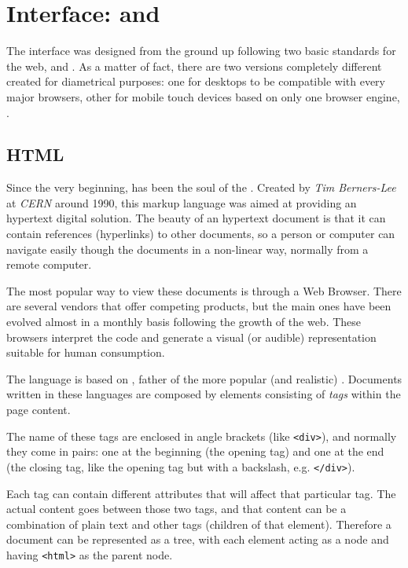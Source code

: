 \section{Interface:  and } %
\label{sec:htmlcss}

The  interface was designed from the ground up following two basic standards for the web,  and .
As a matter of fact, there are two versions completely different created for diametrical purposes: one for desktops to be compatible with every major browsers, other for mobile touch devices based on only one browser engine, .

\subsection{HTML} %
\label{sub:html}

Since the very beginning,  has been the soul of the .
Created by \emph{Tim Berners-Lee} at \emph{CERN} around 1990, this markup language was aimed at providing an hypertext digital solution.
The beauty of an hypertext document is that it can contain references (hyperlinks) to other documents, so a person or computer can navigate easily though the documents in a non-linear way, normally from a remote computer.

The most popular way to view these documents is through a Web Browser.
There are several vendors that offer competing products, but the main ones have been evolved almost in a monthly basis following the growth of the web.
These browsers interpret the code and generate a visual (or audible) representation suitable for human consumption.

The language is based on , father of the more popular (and realistic) .
Documents written in these languages are composed by elements consisting of \emph{tags} within the page content.

The name of these tags are enclosed in angle brackets (like \texttt{<div>}), and normally they come in pairs: one at the beginning (the opening tag) and one at the end (the closing tag, like the opening tag but with a backslash, e.g. \texttt{</div>}).

Each tag can contain different attributes that will affect that particular tag.
The actual content goes between those two tags, and that content can be a combination of plain text and other tags (children of that element).
Therefore a document can be represented as a tree, with each element acting as a node and having \texttt{<html>} as the parent node.

